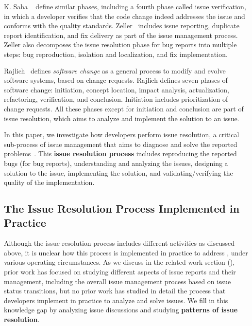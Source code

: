 K. Saha \etal~\cite{saha2015understanding} define similar phases, including a fourth phase called issue verification, in which a developer verifies that the code change indeed addresses the issue and conforms with the quality standards.
Zeller~\cite{zeller2009programs} includes issue reporting, duplicate report identification, and fix delivery as part of the issue management process. Zeller also decomposes the issue resolution phase for bug reports into multiple steps: bug reproduction, isolation and localization, and fix implementation.




Rajlich~\cite{rajlich2011software} defines \textit{software change} as a general process to modify and evolve software systems, based on change requests.
Rajlich defines seven phases of software change: initiation, concept location, impact analysis,  actualization, refactoring, verification, and conclusion. Initiation includes prioritization of change requests. All these phases except for initiation and conclusion are part of issue resolution, which aims to analyze and implement the solution to an issue.


In this paper, we investigate how developers perform issue resolution, a critical sub-process of issue management that aims to diagnose and solve the reported problems~\cite{eren2023analyzing}. 
This \textbf{issue resolution process} includes reproducing the reported bugs (for bug reports), understanding and analyzing the issues, designing a solution to the issue, implementing the solution, and validating/verifying the quality of the implementation.






\subsection{The Issue Resolution Process Implemented in Practice}



Although the issue resolution process includes different activities as discussed above, it is unclear how this process is implemented in practice to address , under various operating circumstances. As we discuss in the related work section (), prior work has focused on studying different aspects of issue reports and their management, including the overall issue management process based on issue status transitions, but no prior work has studied in detail the process that developers implement in practice to analyze and solve issues. We fill in this knowledge gap by analyzing issue discussions and studying  \textbf{patterns of issue resolution}. 


